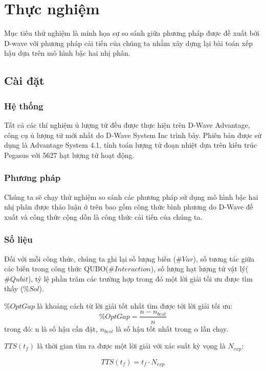 
\chapter{Thực nghiệm}
Mục tiêu thử nghiệm là minh họa sự so sánh giữa phương pháp được đề xuất bởi D-wave với phương pháp cải tiến của chúng ta nhằm xây dựng lại bài toán xếp hậu dựa trên mô hình bậc hai nhị phân.
\section{Cài đặt}
\subsection{Hệ thống}
Tất cả các thí nghiệm ủ lượng tử đều được thực hiện trên D-Wave Advantage, công cụ ủ lượng tử mới nhất do D-Wave System Inc trình bày. Phiên bản được sử dụng là Advantage System 4.1, tính toán lượng tử đoạn nhiệt dựa trên kiến trúc Pegasus với 5627 hạt lượng tử hoạt động. \cite{Performance Update} 
\subsection{Phương pháp}
Chúng ta sẽ chạy thử nghiệm so sánh các phương pháp sử dụng mô hình bậc hai nhị phân được thảo luận ở trên  bao gồm công thức bình phương do D-Wave đề xuất và công thức cộng dồn là công thức cải tiến của chúng ta.

\subsection{Số liệu} 

Đối với mỗi công thức, chúng ta ghi lại số lượng biến ($\#Var$), số tương tác giữa các biến trong công thức QUBO($\#Interaction$), số lượng hạt lượng tử vật lý($\#Qubit$), tỷ lệ phần trăm các trường hợp trong đó một lời giải tối ưu được tìm thấy ($\%Sol$). 

$\%OptGap$ là khoảng cách từ lời giải tốt nhất tìm được tới lời giải tối ưu:
\[
	\%OptGap = \frac{n - n_{best}}{n}
\]
trong đó: n là số hậu cần đặt, $n_{best}$ là số hậu tốt nhất trong $\alpha$ lần chạy.

$TTS(t_f)$ là thời gian tìm ra được một lời giải với xác suất kỳ vọng là $N_{exp}$:

$$TTS(t_f) = t_f \cdot N_{exp}$$

